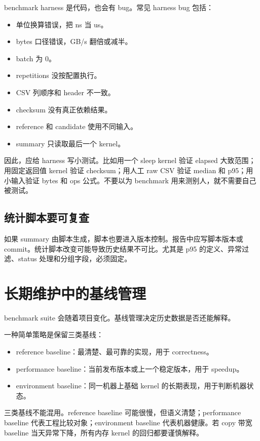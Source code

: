 benchmark harness 是代码，也会有 bug。常见 harness bug 包括：

\begin{itemize}
  \item 单位换算错误，把 ns 当 us。
  \item bytes 口径错误，GB/s 翻倍或减半。
  \item batch 为 0。
  \item repetitions 没按配置执行。
  \item CSV 列顺序和 header 不一致。
  \item checksum 没有真正依赖结果。
  \item reference 和 candidate 使用不同输入。
  \item summary 只读取最后一个 kernel。
\end{itemize}

因此，应给 harness 写小测试。比如用一个 sleep kernel 验证 elapsed 大致范围；用固定返回值 kernel 验证 checksum；用人工 raw CSV 验证 median 和 p95；用小输入验证 bytes 和 ops 公式。不要以为 benchmark 用来测别人，就不需要自己被测试。

\subsection{统计脚本要可复查}

如果 summary 由脚本生成，脚本也要进入版本控制。报告中应写脚本版本或 commit。统计脚本改变可能导致历史结果不可比。尤其是 p95 的定义、异常过滤、status 处理和分组字段，必须固定。

\section{长期维护中的基线管理}

benchmark suite 会随着项目变化。基线管理决定历史数据是否还能解释。

一种简单策略是保留三类基线：

\begin{itemize}
  \item reference baseline：最清楚、最可靠的实现，用于 correctness。
  \item performance baseline：当前发布版本或上一个稳定版本，用于 speedup。
  \item environment baseline：同一机器上基础 kernel 的长期表现，用于判断机器状态。
\end{itemize}

三类基线不能混用。reference baseline 可能很慢，但语义清楚；performance baseline 代表工程比较对象；environment baseline 代表机器健康。若 copy 带宽 baseline 当天异常下降，所有内存 kernel 的回归都要谨慎解释。


